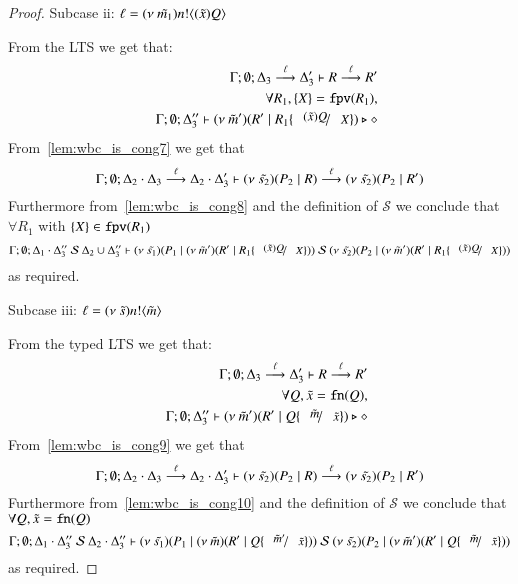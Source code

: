 \begin{proof}
	\noi Subcase ii: $\ell = (\nu\ \tilde{m_1}) n ! \langle (\tilde{x})Q \rangle$

	\noi From the LTS we get that:
	\begin{eqnarray}
		& &	\Gamma; \emptyset; \Delta_3 \by{\ell} \Delta_3' \proves R \by{\ell} R' \label{lem:wbc_is_cong7}\\
		& & 	\forall R_1, \set{X} = \fpv{R_1}, \nonumber\\
		& &	\Gamma; \emptyset; \Delta_3'' \proves \newsp{\tilde{m}'}{R' \Par R_1 \subst{(\tilde{x}) Q}{X}} \hastype \Proc \label{lem:wbc_is_cong8}
	\end{eqnarray}
%
	\noi From~\ref{lem:wbc_is_cong7} we get that
	\[
		\Gamma; \emptyset; \Delta_2 \cdot \Delta_3 \stackrel{\ell}{\longrightarrow} \Delta_2 \cdot \Delta_3' \vdash (\nu\ \tilde{s_2})(P_2 \;|\; R) \stackrel{\ell}{\longrightarrow} (\nu\ \tilde{s_2})(P_2 \;|\; R')
	\]
	\noi Furthermore from~\ref{lem:wbc_is_cong8} and the definition of $\mathcal{S}$ we conclude that
	$\forall R_1$ with $\{X\} \in \mathtt{fpv}(R_1)$
	\[
		\Gamma; \emptyset; \Delta_1 \cat \Delta_3''\ \mathcal{S}\ \Delta_2 \cup \Delta_3'' \proves \newsp{\tilde{s_1}}{P_1 \Par \newsp{\tilde{m}'}{R' \Par R_1 \subst{(\tilde{x}) Q}{X}}}\ \mathcal{S}\ \newsp{\tilde{s_2}}{P_2 \Par \newsp{\tilde{m}'}{R' \Par R_1 \subst{(\tilde{x}) Q}{X}}}
	\]
	\noi as required.

	\noi Subcase iii: $\ell = (\nu\ \tilde{s}) n ! \langle \tilde{m} \rangle$

	\noi From the typed LTS we get that:
	\begin{eqnarray}
		& & \Gamma; \emptyset; \Delta_3 \by{\ell} \Delta_3' \proves R \by{\ell} R' \label{lem:wbc_is_cong9}\\
		& & \forall Q, \tilde{x} = \fn{Q}, \nonumber\\
		& & \Gamma; \emptyset; \Delta_3'' \proves \newsp{\tilde{m}'}{R' \Par Q \subst{\tilde{m}}{\tilde{x}}} \hastype \Proc \label{lem:wbc_is_cong10}
	\end{eqnarray}
%
	\noi From~\ref{lem:wbc_is_cong9} we get that
	\[
		\Gamma; \emptyset; \Delta_2 \cdot \Delta_3 \stackrel{\ell}{\longrightarrow} \Delta_2 \cdot \Delta_3' \vdash (\nu\ \tilde{s_2})(P_2 \;|\; R) \stackrel{\ell}{\longrightarrow} (\nu\ \tilde{s_2})(P_2 \;|\; R')
	\]
	\noi Furthermore from~\ref{lem:wbc_is_cong10} and the definition of $\mathcal{S}$ we conclude that
	$\forall Q, \tilde{x} = \mathtt{fn}(Q)$
	\[
		\Gamma; \emptyset; \Delta_1 \cat \Delta_3''\ \mathcal{S}\ \Delta_2 \cat \Delta_3'' \proves \newsp{\tilde{s_1}}{P_1 \Par \newsp{\tilde{m}}{R' \Par Q \subst{\tilde{m}'}{\tilde{x}}}}\ \mathcal{S}\ \newsp{\tilde{s_2}}{P_2 \Par \newsp{\tilde{m}'}{R' \Par Q \subst{\tilde{m}}{\tilde{x}}}}
	\]
	\noi as required.



\end{proof}
